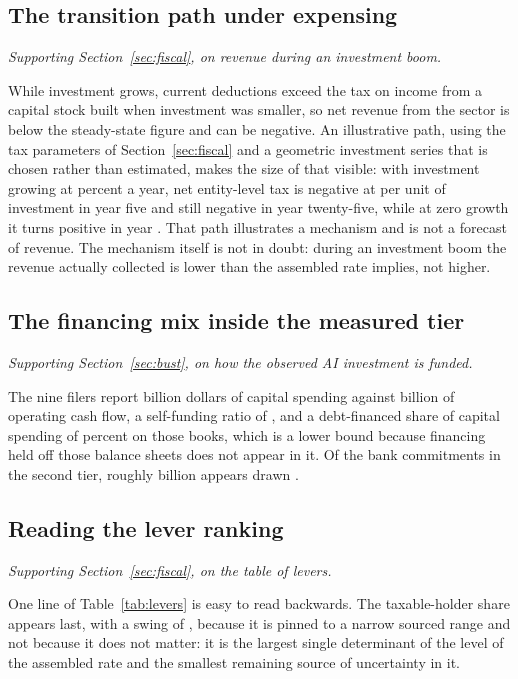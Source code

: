 \subsection{The transition path under expensing}

\emph{Supporting Section~\ref{sec:fiscal}, on revenue during an investment boom.}

While investment grows, current deductions exceed the tax on income from a capital stock built
when investment was smaller, so net revenue from the sector is below the steady-state figure and
can be negative. An illustrative path, using the tax parameters of Section~\ref{sec:fiscal} and a
geometric investment series that is chosen rather than estimated, makes the size of that visible:
with investment growing at  percent a year, net entity-level tax is
negative at  per unit of investment in year five and still negative in
year twenty-five, while at zero growth it turns positive in year
. That path illustrates a mechanism and is not a forecast of
revenue. The mechanism itself is not in doubt: during an investment boom the revenue actually
collected is lower than the assembled rate implies, not higher.

\subsection{The financing mix inside the measured tier}

\emph{Supporting Section~\ref{sec:bust}, on how the observed AI investment is funded.}

The nine filers report  billion dollars of capital spending against
 billion of operating cash flow, a self-funding ratio of
, and a debt-financed share of capital spending of
 percent on those books, which is a lower bound because financing held
off those balance sheets does not appear in it. Of the bank commitments in the second tier,
roughly  billion appears drawn \citep{CohenKillenLau2026}.

\subsection{Reading the lever ranking}

\emph{Supporting Section~\ref{sec:fiscal}, on the table of levers.}

One line of Table~\ref{tab:levers} is easy to read backwards. The taxable-holder share appears
last, with a swing of , because it is pinned to a narrow sourced range and not
because it does not matter: it is the largest single determinant of the level of the assembled
rate and the smallest remaining source of uncertainty in it.
